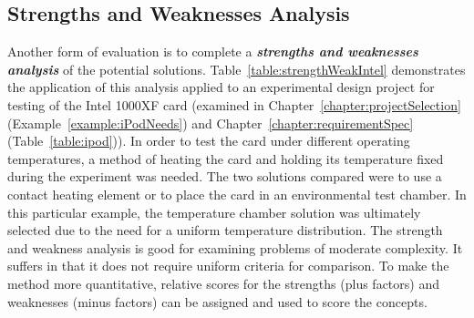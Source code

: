 \subsection{Strengths and Weaknesses Analysis}
\label{subsection:strengths-and-weaknesses-analysis}

Another form of evaluation is to complete a \emph{\textbf{strengths and
weaknesses analysis}} of the potential solutions. 
Table~\ref{table:strengthWeakIntel} demonstrates
the application of this analysis applied to an experi­mental design
project for testing of the Intel 1000XF card (examined in 
Chapter~\ref{chapter:projectSelection}
(Example~\ref{example:iPodNeeds}) and 
Chapter~\ref{chapter:requirementSpec} 
(Table~\ref{table:ipod})). In order to test the card
under different operating temperatures, a method of heating the card and
holding its temperature fixed during the experiment was needed. The two
solutions compared were to use a contact heating element or to place the
card in an environmental test chamber. In this particular example, the
temperature chamber solution was ultimately selected due to the need for
a uniform temperature distribution. The strength and weakness analysis
is good for examining problems of moderate complexity. It suffers in
that it does not require uniform criteria for comparison. To make the
method more quantitative, relative scores for the strengths (plus
factors) and weaknesses (minus factors) can be assigned and used to
score the concepts.

